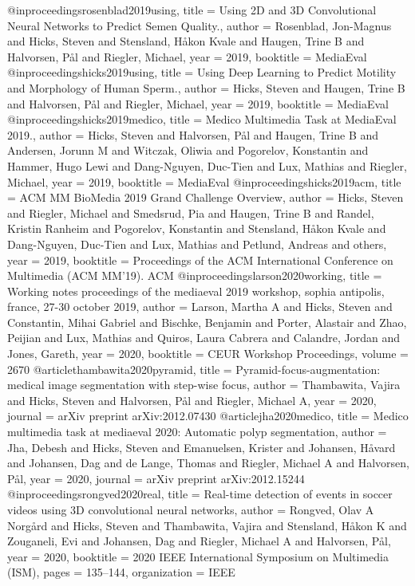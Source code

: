 @inproceedings{rosenblad2019using,
	title = {Using 2D and 3D Convolutional Neural Networks to Predict Semen Quality.},
	author = {Rosenblad, Jon-Magnus and Hicks, Steven and Stensland, H{\aa}kon Kvale and Haugen, Trine B and Halvorsen, P{\aa}l and Riegler, Michael},
	year = 2019,
	booktitle = {MediaEval}
}
@inproceedings{hicks2019using,
	title = {Using Deep Learning to Predict Motility and Morphology of Human Sperm.},
	author = {Hicks, Steven and Haugen, Trine B and Halvorsen, P{\aa}l and Riegler, Michael},
	year = 2019,
	booktitle = {MediaEval}
}
@inproceedings{hicks2019medico,
	title = {Medico Multimedia Task at MediaEval 2019.},
	author = {Hicks, Steven and Halvorsen, P{\aa}l and Haugen, Trine B and Andersen, Jorunn M and Witczak, Oliwia and Pogorelov, Konstantin and Hammer, Hugo Lewi and Dang-Nguyen, Duc-Tien and Lux, Mathias and Riegler, Michael},
	year = 2019,
	booktitle = {MediaEval}
}
@inproceedings{hicks2019acm,
	title = {ACM MM BioMedia 2019 Grand Challenge Overview},
	author = {Hicks, Steven and Riegler, Michael and Smedsrud, Pia and Haugen, Trine B and Randel, Kristin Ranheim and Pogorelov, Konstantin and Stensland, H{\aa}kon Kvale and Dang-Nguyen, Duc-Tien and Lux, Mathias and Petlund, Andreas and others},
	year = 2019,
	booktitle = {Proceedings of the ACM International Conference on Multimedia (ACM MM’19). ACM}
}
@inproceedings{larson2020working,
	title = {Working notes proceedings of the mediaeval 2019 workshop, sophia antipolis, france, 27-30 october 2019},
	author = {Larson, Martha A and Hicks, Steven and Constantin, Mihai Gabriel and Bischke, Benjamin and Porter, Alastair and Zhao, Peijian and Lux, Mathias and Quiros, Laura Cabrera and Calandre, Jordan and Jones, Gareth},
	year = 2020,
	booktitle = {CEUR Workshop Proceedings},
	volume = 2670
}
@article{thambawita2020pyramid,
	title = {Pyramid-focus-augmentation: medical image segmentation with step-wise focus},
	author = {Thambawita, Vajira and Hicks, Steven and Halvorsen, P{\aa}l and Riegler, Michael A},
	year = 2020,
	journal = {arXiv preprint arXiv:2012.07430}
}
@article{jha2020medico,
	title = {Medico multimedia task at mediaeval 2020: Automatic polyp segmentation},
	author = {Jha, Debesh and Hicks, Steven and Emanuelsen, Krister and Johansen, H{\aa}vard and Johansen, Dag and de Lange, Thomas and Riegler, Michael A and Halvorsen, P{\aa}l},
	year = 2020,
	journal = {arXiv preprint arXiv:2012.15244}
}
@inproceedings{rongved2020real,
	title = {Real-time detection of events in soccer videos using 3D convolutional neural networks},
	author = {Rongved, Olav A Norg{\aa}rd and Hicks, Steven and Thambawita, Vajira and Stensland, H{\aa}kon K and Zouganeli, Evi and Johansen, Dag and Riegler, Michael A and Halvorsen, P{\aa}l},
	year = 2020,
	booktitle = {2020 IEEE International Symposium on Multimedia (ISM)},
	pages = {135--144},
	organization = {IEEE}
}

